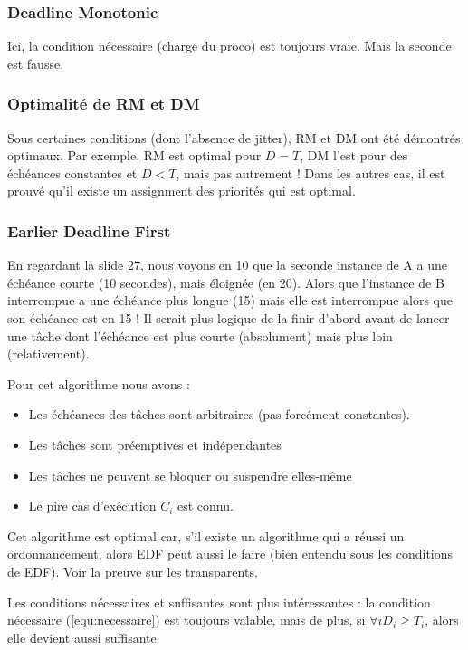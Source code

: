 \documentclass[12pt,a4paper]{article}
\begin{document}
\subsubsection{Deadline Monotonic}
Ici, la condition nécessaire (charge du proco) est toujours vraie. Mais la seconde est fausse. 

\subsubsection*{Optimalité de RM et DM}
Sous certaines conditions (dont l'absence de jitter), RM et DM ont été démontrés optimaux. Par exemple, RM est optimal pour $D=T$, DM l'est pour des échéances constantes et $D < T$, mais pas autrement ! Dans les autres cas, il est prouvé qu'il existe un assignment des priorités qui est optimal.

\subsubsection{Earlier Deadline First}
En regardant la slide 27, nous voyons en 10 que la seconde instance de A a une échéance courte (10 secondes), mais éloignée (en 20). Alors que l'instance de B interrompue a une échéance plus longue (15) mais elle est interrompue alors que son échéance est en 15 ! Il serait plus logique de la finir d'abord avant de lancer une tâche dont l'échéance est plus courte (absolument) mais plus loin (relativement). 

Pour cet algorithme nous avons : 
\begin{itemize}
    \item Les échéances des tâches sont arbitraires (pas forcément constantes).
    \item Les tâches sont préemptives et indépendantes
    \item Les tâches ne peuvent se bloquer ou suspendre elles-même
    \item Le pire cas d'exécution $C_i$ est connu.
\end{itemize}
Cet algorithme est optimal car, s'il existe un algorithme qui a réussi un ordonnancement, alors EDF peut aussi le faire (bien entendu sous les conditions de EDF). Voir la preuve sur les transparents.

\begin{boite}
    Les conditions nécessaires et suffisantes sont plus intéressantes : la condition nécessaire (\ref{equ:necessaire}) est toujours valable, mais de plus, si $\forall i D_i \geq T_i$, alors elle devient aussi suffisante
\end{boite}
\end{document}
